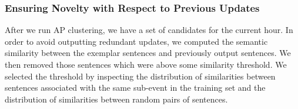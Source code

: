 \subsubsection{Ensuring Novelty with Respect to Previous Updates}
\label{sec:novelty}
After we run AP clustering, we have a set of candidates for the current hour.  In order to avoid outputting redundant updates, we computed the semantic similarity between the exemplar sentences and previously output sentences.  We then removed those sentences which were above some similarity threshold.  We selected the threshold by inspecting the distribution of similarities between sentences associated with the same sub-event in the training set and the distribution of similarities between random pairs of sentences.  

%

